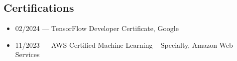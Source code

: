 \documentclass[10pt,letterpaper]{article}
\begin{document}
\begin{paracol}{2}
\begin{rightcolumn}
\section*{Certifications}
\begin{itemize}
  \item 02/2024 — TensorFlow Developer Certificate, Google
  \item 11/2023 — AWS Certified Machine Learning – Specialty, Amazon Web Services
\end{itemize}

\end{rightcolumn}

\end{paracol}
\end{document}
